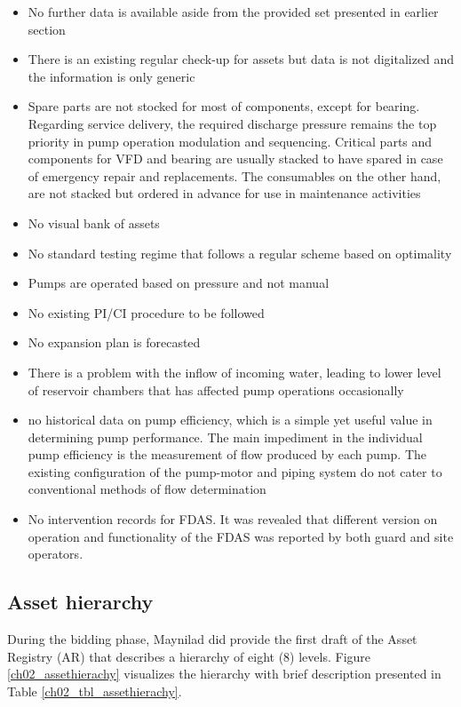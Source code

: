 \begin{itemize}
\item No further data is available aside from the provided set presented in earlier section
\item There is an existing regular check-up for assets but data is not digitalized and the information is only generic
\item Spare parts are not stocked for most of components, except for bearing. Regarding service delivery, the required discharge pressure remains the top priority in pump operation modulation and sequencing. Critical parts and components for VFD and bearing are usually stacked to have spared in case of emergency repair and replacements. The consumables on the other hand, are not stacked but ordered in advance for use in maintenance activities
\item No visual bank of assets
\item No standard testing regime that follows a regular scheme based on optimality
\item Pumps are operated based on pressure and not manual
\item No existing PI/CI procedure to be followed
\item No expansion plan is forecasted
\item There is a problem with the inflow of incoming water, leading to lower level of reservoir chambers that has affected pump operations occasionally
\item no historical data on pump efficiency, which is a simple yet useful value in determining pump performance. The main impediment in  the individual pump efficiency is the measurement of flow produced by each pump. The existing configuration of the pump-motor and piping system do not cater to conventional methods of flow determination
\item No intervention records for FDAS. It was revealed that different version on operation and functionality of the FDAS was reported by both guard and site operators.
\end{itemize}

\subsection{Asset hierarchy}
\label{214}
During the bidding phase, Maynilad did provide the first draft of the Asset Registry (AR) that describes a hierarchy of eight (8) levels. Figure \ref{ch02_assethierachy} visualizes the hierarchy with brief description presented in Table \ref{ch02_tbl_assethierachy}.

